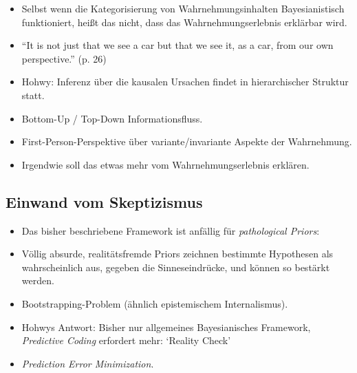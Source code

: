 \documentclass[11pt, handout]{beamer}
\begin{document}
\begin{frame}
  
  \begin{itemize}[<+->]
  \item Selbst wenn die Kategorisierung von Wahrnehmungsinhalten Bayesianistisch funktioniert, heißt das nicht, dass das Wahrnehmungserlebnis erklärbar wird. 
  \item ``It is not just that we see a car but that we see it, as a car, from our own perspective.'' (p. 26)
  \item Hohwy: Inferenz über die kausalen Ursachen findet in hierarchischer Struktur statt. 
  \item Bottom-Up / Top-Down Informationsfluss. 
  \item First-Person-Perspektive über variante/invariante Aspekte der Wahrnehmung.
  \item Irgendwie soll das etwas mehr vom Wahrnehmungserlebnis erklären.
  \end{itemize}

\end{frame}

\subsection{Einwand vom Skeptizismus}

\begin{frame}
  \begin{itemize}[<+->]
  \item Das bisher beschriebene Framework ist anfällig für
    \emph{pathological Priors}:
  \item Völlig absurde, realitätsfremde Priors zeichnen bestimmte
    Hypothesen als wahrscheinlich aus, gegeben die Sinneseindrücke,
    und können so bestärkt werden.
  \item Bootstrapping-Problem (ähnlich epistemischem Internalismus).
  \item Hohwys Antwort: Bisher nur allgemeines Bayesianisches
    Framework, \emph{Predictive Coding} erfordert mehr: `Reality
    Check'
  \item \emph{Prediction Error Minimization}.
  \end{itemize}
\end{frame}
\end{document}
